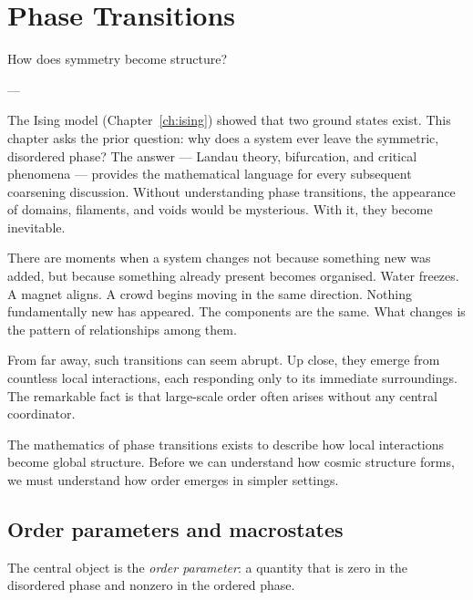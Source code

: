 
\chapter{Phase Transitions}
\label{ch:phase-transitions}

\epigraph{%
  How does symmetry become structure?%
}{---}

\begin{WhyChapter}
  The Ising model (Chapter~\ref{ch:ising}) showed that two
  ground states exist.
  This chapter asks the prior question: why does a system
  ever leave the symmetric, disordered phase?
  The answer --- Landau theory, bifurcation, and critical
  phenomena --- provides the mathematical language for every
  subsequent coarsening discussion.
  Without understanding phase transitions, the appearance of
  domains, filaments, and voids would be mysterious.
  With it, they become inevitable.
\end{WhyChapter}


\begin{ChapterIntro}
There are moments when a system changes not because something new was added, but because something already present becomes organised. Water freezes. A magnet aligns. A crowd begins moving in the same direction. Nothing fundamentally new has appeared. The components are the same. What changes is the pattern of relationships among them.

From far away, such transitions can seem abrupt. Up close, they emerge from countless local interactions, each responding only to its immediate surroundings. The remarkable fact is that large-scale order often arises without any central coordinator.

The mathematics of phase transitions exists to describe how local interactions become global structure. Before we can understand how cosmic structure forms, we must understand how order emerges in simpler settings.
\end{ChapterIntro}

\section{Order parameters and macrostates}

The central object is the \emph{order parameter}: a quantity
that is zero in the disordered phase and nonzero in the
ordered phase.

